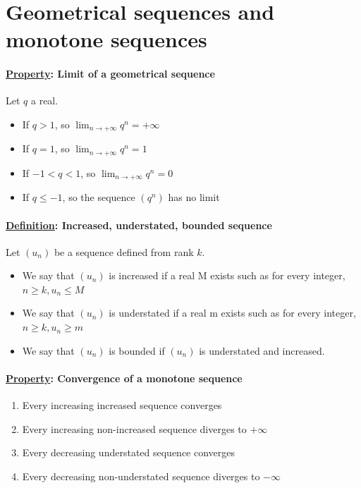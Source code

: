 \documentclass{article}
\newcommand{\definition}[1]{\paragraph*{\underline{Definition}: #1}}
\newcommand{\property}[1]{\paragraph*{\underline{Property}: #1}}
\begin{document}
\section{Geometrical sequences and monotone sequences}
\property{Limit of a geometrical sequence}
Let $q$ a real.
\begin{itemize}
    \item If $q > 1$, so $\lim_{n \to +\infty} q^n = +\infty$
    \item If $q = 1$, so $\lim_{n \to +\infty} q^n = 1$
    \item If $-1 < q < 1$, so $\lim_{n \to +\infty} q^n = 0$
    \item If $q \le -1$, so the sequence $(q^n)$ has no limit
\end{itemize}
\definition{Increased, understated, bounded sequence}
Let $(u_n)$ be a sequence defined from rank $k$.
\begin{itemize}
    \item We say that $(u_n)$ is increased if a real M exists such as for every integer, $n \ge k, u_n \le M$
    \item We say that $(u_n)$ is understated if a real m exists such as for every integer, $n \ge k, u_n \ge m$
    \item We say that $(u_n)$ is bounded if $(u_n)$ is understated and increased.
\end{itemize}
\property{Convergence of a monotone sequence}
\begin{enumerate}
    \item Every increasing increased sequence converges
    \item Every increasing non-increased sequence diverges to $+\infty$
    \item Every decreasing understated sequence converges
    \item Every decreasing non-understated sequence diverges to $-\infty$
\end{enumerate}
\end{document}
